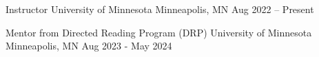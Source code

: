 

\begin{cventries}

  \cventry
    {Instructor} %
    {University of Minnesota} %
    {Minneapolis, MN} %
    {Aug 2022 – Present} %
    {
    }

  \cventry
    {Mentor from Directed Reading Program (DRP)} %
    {University of Minnesota} %
    {Minneapolis, MN} %
    {Aug 2023 - May 2024} %
    {
    }


\end{cventries}
